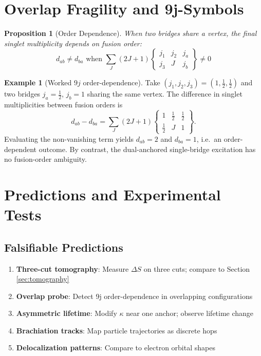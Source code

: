 \documentclass[11pt]{article}
\theoremstyle{plain}
\newtheorem{proposition}[theorem]{Proposition}
\theoremstyle{definition}
\newtheorem{example}[theorem]{Example}
\begin{document}
\section{Overlap Fragility and 9j-Symbols}
\label{sec:overlap}

\begin{proposition}[Order Dependence]
  When two bridges share a vertex, the final singlet multiplicity depends on fusion order:
  \begin{equation}
    d_{ab} \neq d_{ba} \text{ when } \sum_J (2J+1)
    \begin{Bmatrix} j_1 & j_2 & j_a \\ j_3 & J & j_b
    \end{Bmatrix} \neq 0
  \end{equation}
\end{proposition}

\begin{example}[Worked $9j$ order-dependence]
  Take $(j_1,j_2,j_3)=(1,\tfrac12,\tfrac12)$ and two bridges $j_a=\tfrac12$, $j_b=1$ sharing the same vertex. The difference in singlet multiplicities between fusion orders is
  \begin{equation}
    d_{ab}-d_{ba} = \sum_{J}(2J+1)
    \begin{Bmatrix}
      1 & \tfrac12 & \tfrac12 \\
      \tfrac12 & J & 1
    \end{Bmatrix}.
  \end{equation}
  Evaluating the non-vanishing term yields $d_{ab}=2$ and $d_{ba}=1$, i.e.\ an order-dependent outcome. By contrast, the dual-anchored single-bridge excitation has no fusion-order ambiguity.
\end{example}

\section{Predictions and Experimental Tests}
\label{sec:tests}

\subsection{Falsifiable Predictions}
\begin{enumerate}
  \item \textbf{Three-cut tomography}: Measure $\Delta S$ on three cuts; compare to Section \ref{sec:tomography}
  \item \textbf{Overlap probe}: Detect 9j order-dependence in overlapping configurations
  \item \textbf{Asymmetric lifetime}: Modify $\kappa$ near one anchor; observe lifetime change
  \item \textbf{Brachiation tracks}: Map particle trajectories as discrete hops
  \item \textbf{Delocalization patterns}: Compare to electron orbital shapes
\end{enumerate}
\end{document}

